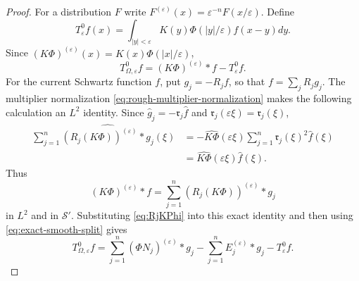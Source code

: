 \documentclass[11pt]{article}
\numberwithin{equation}{section}
\theoremstyle{remark}
\theoremstyle{definition}
\begin{document}
\begin{proof}
For a distribution $F$ write $F^{(\varepsilon)}(x)=
\varepsilon^{-n}F(x/\varepsilon)$.  Define
\[
 T^0_\varepsilon f(x)=\int_{|y|<\varepsilon}
 K(y)\Phi(|y|/\varepsilon)f(x-y)dy.
\]
Since $(K\Phi)^{(\varepsilon)}(x)=K(x)\Phi(|x|/\varepsilon)$,
\begin{equation}\label{eq:exact-smooth-split}
 T^0_{\Omega,\varepsilon}f=(K\Phi)^{(\varepsilon)}*f-T^0_\varepsilon f.
\end{equation}
For the current Schwartz function $f$, put $g_j=-R_jf$, so that
$f=\sum_jR_jg_j$.  The multiplier normalization
\eqref{eq:rough-multiplier-normalization} makes the following calculation
an $L^2$ identity.  Since
$\widehat g_j=-\mathfrak r_j\widehat f$ and
$\mathfrak r_j(\varepsilon\xi)=\mathfrak r_j(\xi)$,
\begin{align*}
 \sum_{j=1}^n
 \widehat{(R_j(K\Phi))^{(\varepsilon)}*g_j}(\xi)
 &=-\widehat{K\Phi}(\varepsilon\xi)
   \sum_{j=1}^n\mathfrak r_j(\xi)^2\widehat f(\xi)\\
 &=\widehat{K\Phi}(\varepsilon\xi)\widehat f(\xi).
\end{align*}
Thus
\[
 (K\Phi)^{(\varepsilon)}*f
 =\sum_{j=1}^n(R_j(K\Phi))^{(\varepsilon)}*g_j
\]
in $L^2$ and in $\mathcal S'$.  Substituting
\eqref{eq:RjKPhi} into this exact identity and then using
\eqref{eq:exact-smooth-split} gives
\begin{equation}\label{eq:exact-Riesz-factorization}
 T^0_{\Omega,\varepsilon}f
 =\sum_{j=1}^n(\Phi N_j)^{(\varepsilon)}*g_j
  -\sum_{j=1}^nE_j^{(\varepsilon)}*g_j-T^0_\varepsilon f.
\end{equation}


\end{proof}
\end{document}
